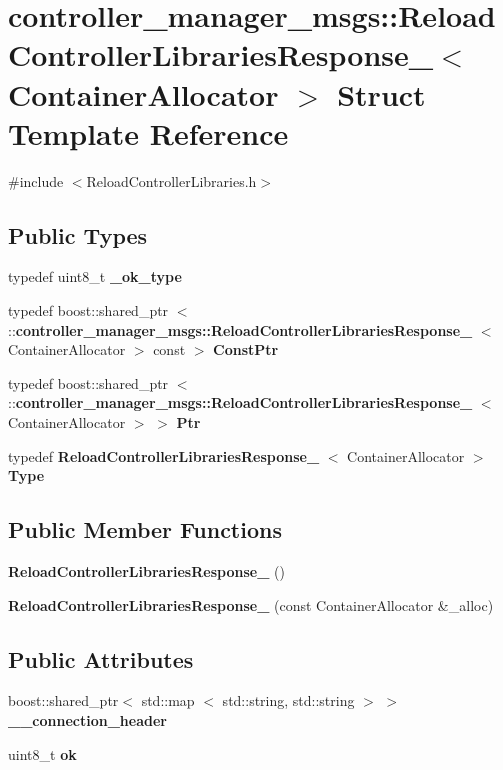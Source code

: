 \section{controller\-\_\-manager\-\_\-msgs\-:\-:\-Reload\-Controller\-Libraries\-Response\-\_\-$<$ \-Container\-Allocator $>$ \-Struct \-Template \-Reference}
\label{structcontroller__manager__msgs_1_1ReloadControllerLibrariesResponse__}


{\ttfamily \#include $<$\-Reload\-Controller\-Libraries.\-h$>$}

\subsection*{\-Public \-Types}
\begin{DoxyCompactItemize}
\item 
typedef uint8\-\_\-t {\bf \-\_\-ok\-\_\-type}
\item 
typedef boost\-::shared\-\_\-ptr\*
$<$ \-::{\bf controller\-\_\-manager\-\_\-msgs\-::\-Reload\-Controller\-Libraries\-Response\-\_\-}\*
$<$ \-Container\-Allocator $>$ const  $>$ {\bf \-Const\-Ptr}
\item 
typedef boost\-::shared\-\_\-ptr\*
$<$ \-::{\bf controller\-\_\-manager\-\_\-msgs\-::\-Reload\-Controller\-Libraries\-Response\-\_\-}\*
$<$ \-Container\-Allocator $>$ $>$ {\bf \-Ptr}
\item 
typedef \*
{\bf \-Reload\-Controller\-Libraries\-Response\-\_\-}\*
$<$ \-Container\-Allocator $>$ {\bf \-Type}
\end{DoxyCompactItemize}
\subsection*{\-Public \-Member \-Functions}
\begin{DoxyCompactItemize}
\item 
{\bf \-Reload\-Controller\-Libraries\-Response\-\_\-} ()
\item 
{\bf \-Reload\-Controller\-Libraries\-Response\-\_\-} (const \-Container\-Allocator \&\-\_\-alloc)
\end{DoxyCompactItemize}
\subsection*{\-Public \-Attributes}
\begin{DoxyCompactItemize}
\item 
boost\-::shared\-\_\-ptr$<$ std\-::map\*
$<$ std\-::string, std\-::string $>$ $>$ {\bf \-\_\-\-\_\-connection\-\_\-header}
\item 
uint8\-\_\-t {\bf ok}
\end{DoxyCompactItemize}


